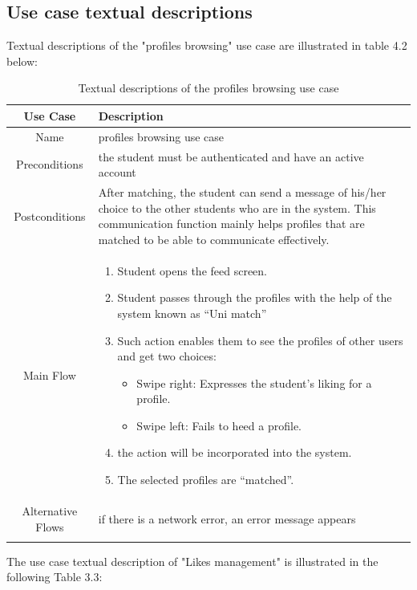 \subsection{Use case textual descriptions}
Textual descriptions of the "profiles browsing" use case are illustrated in table 4.2 below:
\begin{longtable}{|c|p{10cm}|}
\hline
Use Case & Description \\\hline
Name & profiles browsing use case \\\hline
Preconditions & the student must be authenticated and have an active account \\\hline
Postconditions & After matching, the student can send a message of his/her choice to the other students who are in the system. This communication function mainly helps profiles that are matched to be able to communicate effectively. \\ \hline
Main Flow & 
\begin{enumerate}
    \item Student opens the feed screen.
    \item   Student passes through the profiles with the help of the system known as “Uni match”
    \item Such action enables them to see the profiles of other users and get two choices:
        \begin{itemize}
            \item   Swipe right: Expresses the student’s liking for a profile.
            \item   Swipe left: Fails to heed a profile.
        \end{itemize} 
        \item the action will be incorporated into the system. 
        \item The selected profiles are “matched”.
\end{enumerate}

\\\hline
Alternative Flows & 
    if there is a network error, an error message appears
\\\hline
\caption{Textual descriptions of the profiles browsing use case}
\label{Tab: Textual descriptions of the profiles browsing use case}
\end{longtable}

The use case textual description of "Likes management" is illustrated in the
following Table 3.3:


